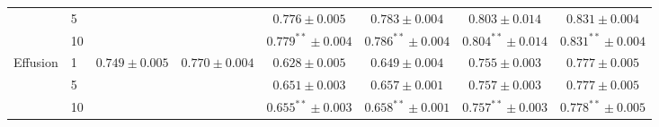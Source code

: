 \begin{table}[htbp]
{\begin{tabular}{llcccccc}
 & 5 &  &  & $0.776 \pm 0.005$ & $0.783 \pm 0.004$ & $0.803 \pm 0.014$ & $\mathbf{0.831} \pm 0.004$ \\
 & 10 &  &  & $0.779^{**} \pm 0.004$ & $0.786^{**} \pm 0.004$ & $0.804^{**} \pm 0.014$ & $\mathbf{0.831}^{**} \pm 0.004$ \\
\midrule
\multirow{3}{*}{Effusion} & 1 & \multirow{3}{*}{$0.749 \pm 0.005$} & \multirow{3}{*}{$0.770 \pm 0.004$} & $0.628 \pm 0.005$ & $0.649 \pm 0.004$ & $0.755 \pm 0.003$ & $\mathbf{0.777} \pm 0.005$ \\
 & 5 &  &  & $0.651 \pm 0.003$ & $0.657 \pm 0.001$ & $0.757 \pm 0.003$ & $\mathbf{0.777} \pm 0.005$ \\
 & 10 &  &  & $0.655^{**} \pm 0.003$ & $0.658^{**} \pm 0.001$ & $0.757^{**} \pm 0.003$ & $\mathbf{0.778}^{**} \pm 0.005$ \\
\bottomrule
\end{tabular}}
\end{table}
